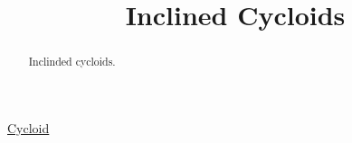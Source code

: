 \documentclass{ximera}
\title{Inclined Cycloids}
\begin{document}
\begin{abstract}
Inclinded cycloids.
\end{abstract}
\maketitle

\begin{exploration}  \label{Exhjjjjnbbbbbr}

\href{https://www.geogebra.org/classic/vxbjccpa}{Cycloid}

 
\begin{onlineOnly}
    \begin{center}
\end{center}
\end{onlineOnly}

\end{exploration}
\end{document}
